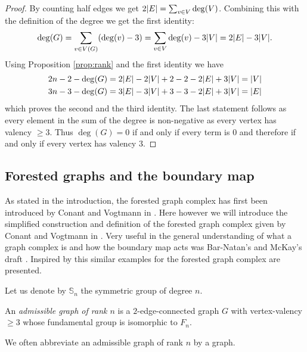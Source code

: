 \begin{proof}
	By counting half edges we get $2 \abs{E} = \sum_{v \in V} \deg(V)$.
	Combining this with the definition of the degree we get the first identity:
	\[
		\deg(G) = \sum_{v \in V(G)} (\deg(v) - 3) = \sum_{v \in V} \deg(v) - 3 \abs{V} = 2  \abs{E} - 3 \abs{V}
	.\] 
	Using Proposition \ref{prop:rank} and the first identity we have
	\begin{align*}
		2 n -2 - \deg(G) &= 2 \abs{E} - 2 \abs{V} + 2 - 2 - 2\abs{E} + 3 \abs{V} = \abs{V}\\
		3 n -3 - \deg(G) &= 3 \abs{E} - 3 \abs{V} + 3 - 3 - 2\abs{E} + 3 \abs{V} = \abs{E}
	\end{align*}
	which proves the second and the third identity. The last statement follows as every element in the sum of the degree is non-negative as every vertex has valency $\geq 3$.
	Thus $\deg(G) = 0$ if and only if every term is $0$ and therefore if and only if every vertex has valency $3$.
\end{proof}

\subsection{Forested graphs and the boundary map}
\label{sec:ForestedGraphBoundary}
As stated in the introduction, the forested graph complex has first been introduced by Conant and Vogtmann in \cite{conant03}.
Here however we will introduce the simplified construction and definition of the forested graph complex given by Conant and Vogtmann in \cite{conant08}.
Very useful in the general understanding of  what a graph complex is and how the boundary map acts was Bar-Natan's and McKay's draft \cite{natan01}.
Inspired by this similar examples for the forested graph complex are presented.

Let us denote by $\mathbb{S}_{n}$ the symmetric group of degree $n$.
\begin{definition}
	An \emph{admissible graph of rank $n$} is a $2$-edge-connected graph $G$ with vertex-valency $\geq 3$ whose fundamental group is isomorphic to $F_{n}$.
\end{definition}

We often abbreviate an admissible graph of rank $n$ by a graph.

